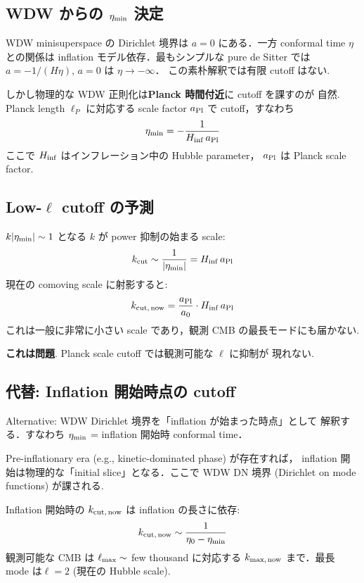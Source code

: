 \documentclass[11pt,a4paper]{article}
\begin{document}
\subsection{WDW からの $\eta_{\rm min}$ 決定}

WDW minisuperspace の Dirichlet 境界は $a=0$ にある．一方 conformal
time $\eta$ との関係は inflation モデル依存．最もシンプルな
pure de Sitter では $a = -1/(H\eta)$, $a = 0$ は $\eta \to -\infty$．
この素朴解釈では有限 cutoff はない.

しかし物理的な WDW 正則化は\textbf{Planck 時間付近}に cutoff を課すのが
自然. Planck length $\ell_P$ に対応する scale factor $a_{\rm Pl}$
で cutoff，すなわち
\begin{equation}
\eta_{\rm min} = -\frac{1}{H_{\rm inf}\, a_{\rm Pl}}
\end{equation}
ここで $H_{\rm inf}$ はインフレーション中の Hubble parameter，
$a_{\rm Pl}$ は Planck scale factor.

\subsection{Low-$\ell$ cutoff の予測}

$k|\eta_{\rm min}| \sim 1$ となる $k$ が power 抑制の始まる scale:
\begin{equation}
k_{\rm cut} \sim \frac{1}{|\eta_{\rm min}|} = H_{\rm inf}\, a_{\rm Pl}
\end{equation}
現在の comoving scale に射影すると:
\begin{equation}
k_{\rm cut,\,now} = \frac{a_{\rm Pl}}{a_0}\cdot H_{\rm inf}\, a_{\rm Pl}
\end{equation}
これは一般に非常に小さい scale であり，観測 CMB の最長モードにも届かない.

\textbf{これは問題}. Planck scale cutoff では観測可能な $\ell$ に抑制が
現れない.

\subsection{代替: Inflation 開始時点の cutoff}

Alternative: WDW Dirichlet 境界を「inflation が始まった時点」として
解釈する．すなわち $\eta_{\rm min}$ = inflation 開始時 conformal time．

Pre-inflationary era (e.g., kinetic-dominated phase) が存在すれば，
inflation 開始は物理的な「initial slice」となる．ここで WDW DN 境界
(Dirichlet on mode functions) が課される.

Inflation 開始時の $k_{\rm cut,\,now}$ は inflation の長さに依存:
\begin{equation}
k_{\rm cut,\,now} \sim \frac{1}{\eta_0 - \eta_{\rm min}}
\end{equation}
観測可能な CMB は $\ell_{\rm max} \sim$ few thousand に対応する
$k_{\rm max,\,now}$ まで．最長 mode は$\ell=2$ (現在の Hubble scale).
\end{document}
